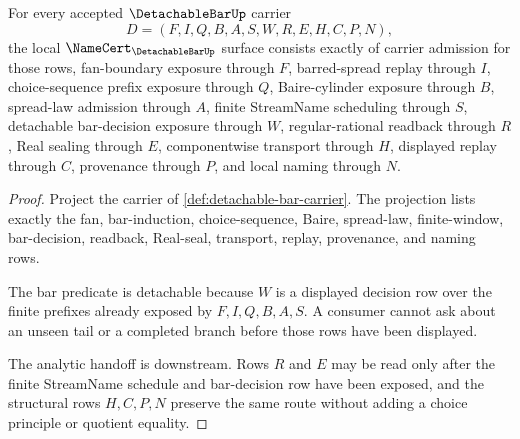 \begin{theorem}
\label{thm:detachable-bar-namecert-obligations}
For every accepted $\DetachableBarUp$ carrier
$$
D=(F,I,Q,B,A,S,W,R,E,H,C,P,N),
$$
the local $\NameCert_{\DetachableBarUp}$ surface consists exactly of carrier admission for those rows, fan-boundary exposure through $F$, barred-spread replay through $I$, choice-sequence prefix exposure through $Q$, Baire-cylinder exposure through $B$, spread-law admission through $A$, finite StreamName scheduling through $S$, detachable bar-decision exposure through $W$, regular-rational readback through $R$, Real sealing through $E$, componentwise transport through $H$, displayed replay through $C$, provenance through $P$, and local naming through $N$.
\end{theorem}
\begin{proof}
Project the carrier of \autoref{def:detachable-bar-carrier}. The projection lists exactly the fan, bar-induction, choice-sequence, Baire, spread-law, finite-window, bar-decision, readback, Real-seal, transport, replay, provenance, and naming rows.

The bar predicate is detachable because $W$ is a displayed decision row over the finite prefixes already exposed by $F,I,Q,B,A,S$. A consumer cannot ask about an unseen tail or a completed branch before those rows have been displayed.

The analytic handoff is downstream. Rows $R$ and $E$ may be read only after the finite StreamName schedule and bar-decision row have been exposed, and the structural rows $H,C,P,N$ preserve the same route without adding a choice principle or quotient equality.
\end{proof}

